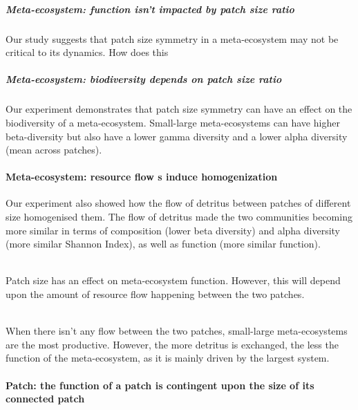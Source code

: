 \documentclass[
]{article}
\begin{document}
\hypertarget{meta-ecosystem-function-isnt-impacted-by-patch-size-ratio}{%
\subparagraph{Meta-ecosystem: function isn't impacted by patch size
ratio}\label{meta-ecosystem-function-isnt-impacted-by-patch-size-ratio}}

Our study suggests that patch size symmetry in a meta-ecosystem may not
be critical to its dynamics. How does this

\hypertarget{meta-ecosystem-biodiversity-depends-on-patch-size-ratio}{%
\subparagraph{Meta-ecosystem: biodiversity depends on patch size
ratio}\label{meta-ecosystem-biodiversity-depends-on-patch-size-ratio}}

Our experiment demonstrates that patch size symmetry can have an effect
on the biodiversity of a meta-ecosystem. Small-large meta-ecosystems can
have higher beta-diversity but also have a lower gamma diversity and a
lower alpha diversity (mean across patches).

\hypertarget{meta-ecosystem-resource-flow-s-induce-homogenization}{%
\paragraph{Meta-ecosystem: resource flow s induce
homogenization}\label{meta-ecosystem-resource-flow-s-induce-homogenization}}

Our experiment also showed how the flow of detritus between patches of
different size homogenised them. The flow of detritus made the two
communities becoming more similar in terms of composition (lower beta
diversity) and alpha diversity (more similar Shannon Index), as well as
function (more similar function).\\
\strut \\
Patch size has an effect on meta-ecosystem function. However, this will
depend upon the amount of resource flow happening between the two
patches.\\
\strut \\
When there isn't any flow between the two patches, small-large
meta-ecosystems are the most productive. However, the more detritus is
exchanged, the less the function of the meta-ecosystem, as it is mainly
driven by the largest system.

\hypertarget{patch-the-function-of-a-patch-is-contingent-upon-the-size-of-its-connected-patch}{%
\paragraph{Patch: the function of a patch is contingent upon the size of
its connected
patch}\label{patch-the-function-of-a-patch-is-contingent-upon-the-size-of-its-connected-patch}}
\end{document}
